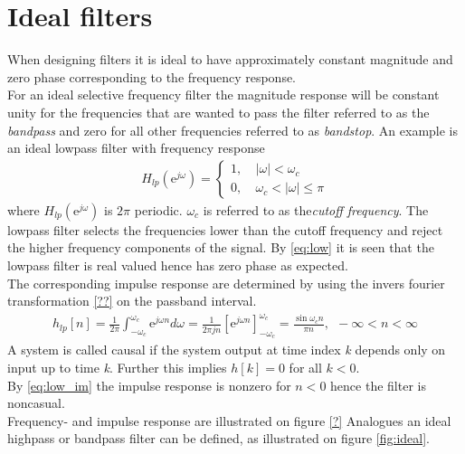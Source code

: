 \section{Ideal filters} 
When designing filters it is ideal to have approximately constant magnitude and zero phase corresponding to the frequency response. \\ For an ideal selective frequency filter the magnitude response will be constant unity for the frequencies that are wanted to pass the filter referred to as the \textit{bandpass} and zero for all other frequencies referred to as \textit{bandstop}. An example is an ideal lowpass filter with frequency response 
\begin{align}\label{eq:low}
H_{lp}(\text{e}^{j\omega})=
\left\{ \begin{matrix}
1, &\ \left| \omega \right|< \omega_c \\
0, &\ \omega_c < \left| \omega \right| \leq \pi
\end{matrix}\right.
\end{align}     
where $H_{lp}(\text{e}^{j\omega})$ is $2\pi$ periodic. $\omega_c$ is referred to as the\textit{cutoff frequency}. The lowpass filter selects the frequencies lower than the cutoff frequency and reject the higher frequency components of the signal. By \eqref{eq:low} it is seen that the lowpass filter is real valued hence has zero phase as expected. \\
The corresponding impulse response are determined by using the invers fourier transformation \eqref{??} on the passband interval.
\begin{align}\label{eq:low_im}
h_{lp}[n]=\frac{1}{2\pi}\int_{-\omega_c}^{\omega_c}\text{e}^{j\omega n} d\omega = \frac{1}{2\pi j n}\left[\text{e}^{j\omega n} \right]_{-\omega_c}^{\omega_c} = \frac{\sin \omega_c n}{\pi n }, \ \  -\infty < n < \infty
\end{align}  
A system is called causal if the system output at time index \textit{k} depends only on input up to time \textit{k}. Further this implies $h[k] = 0$ for all $k<0$.\cite{FSP,p.196 & 208}  \\
By \eqref{eq:low_im} the impulse response is nonzero for $n<0$ hence the filter is noncasual.\\
Frequency- and impulse response are illustrated on figure \ref{?} 
Analogues an ideal highpass or bandpass filter can be defined, as illustrated on figure \ref{fig:ideal}.\\ 

